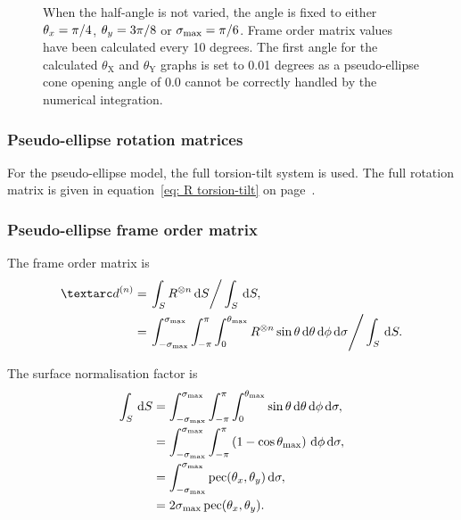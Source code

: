 \begin{figure}
{    When the half-angle is not varied, the angle is fixed to either $\theta_x = \pi/4$, $\theta_y = 3\pi/8$ or $\sigma_\textrm{max} = \pi/6$.
    Frame order matrix values have been calculated every 10 degrees.
    The first angle for the calculated $\theta_\textrm{X}$ and $\theta_\textrm{Y}$ graphs is set to 0.01 degrees as a pseudo-ellipse cone opening angle of 0.0 cannot be correctly handled by the numerical integration.
  }
  \label{fig: simulated and calculated out-of-frame 2nd degree pseudo-ellipse frame order}
\end{figure}



\subsubsection{Pseudo-ellipse rotation matrices}

For the pseudo-ellipse model, the full torsion-tilt system is used.
The full rotation matrix is given in equation~\ref{eq: R torsion-tilt} on page~\pageref{eq: R torsion-tilt}.



\subsubsection{Pseudo-ellipse frame order matrix}

The frame order matrix is
\begin{subequations}
\begin{align}
    \FOn &= \left. \int_S R^{\otimes n} \diff S \right / \int_S \diff S, \\
         &= \left. \int_{-\conesmax}^{\conesmax} \int_{-\pi}^{\pi} \int_{0}^{\conethetamax} R^{\otimes n} \sin\theta \diff\theta \diff\phi \diff\sigma  \right / \int_S \diff S .
\end{align}
\end{subequations}

The surface normalisation factor is
\begin{subequations}
\begin{align}
    \int_S \,\mathrm{d} S &= \int_{-\sigma_\textrm{max}}^{\sigma_\textrm{max}} \int_{-\pi}^{\pi} \int_{0}^{\theta_\textrm{max}} \sin\theta \,\mathrm{d}\theta \,\mathrm{d}\phi \,\mathrm{d}\sigma , \\
                   &= \int_{-\sigma_\textrm{max}}^{\sigma_\textrm{max}} \int_{-\pi}^{\pi} \left( 1 - \cos\theta_\textrm{max} \right) \,\mathrm{d}\phi \,\mathrm{d}\sigma , \label{eq: pseudo-ellipse surface norm non-integratable} \\
                   &= \int_{-\sigma_\textrm{max}}^{\sigma_\textrm{max}} \operatorname{pec}(\theta_x, \theta_y) \,\mathrm{d}\sigma , \\
                   &= 2\sigma_\textrm{max} \operatorname{pec}(\theta_x, \theta_y) .
\end{align}
\end{subequations}

